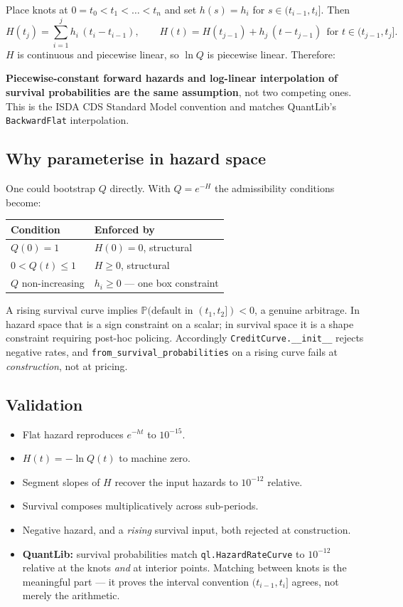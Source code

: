 \documentclass[11pt,a4paper]{article}
\newcommand{\keypoint}[1]{%
  \par\vspace{0.4em}\noindent
  \colorbox{codebg}{\parbox{\dimexpr\linewidth-2\fboxsep}{\small #1}}%
  \par\vspace{0.5em}}
\begin{document}
Place knots at $0 = t_0 < t_1 < \dots < t_n$ and set $h(s) = h_i$ for
$s \in (t_{i-1}, t_i]$. Then
\[
H(t_j) = \sum_{i=1}^{j} h_i\,(t_i - t_{i-1}),
\qquad
H(t) = H(t_{j-1}) + h_j\,(t - t_{j-1}) \ \ \text{for } t \in (t_{j-1}, t_j].
\]
$H$ is continuous and piecewise linear, so $\ln Q$ is piecewise linear. Therefore:

\keypoint{\textbf{Piecewise-constant forward hazards and log-linear interpolation of
survival probabilities are the same assumption}, not two competing ones. This is the ISDA
CDS Standard Model convention and matches QuantLib's \texttt{BackwardFlat} interpolation.}

\subsection{Why parameterise in hazard space}

One could bootstrap $Q$ directly. With $Q = e^{-H}$ the admissibility conditions become:

\begin{center}
\begin{tabular}{ll}
\toprule
\textbf{Condition} & \textbf{Enforced by} \\
\midrule
$Q(0) = 1$ & $H(0)=0$, structural \\
$0 < Q(t) \le 1$ & $H \ge 0$, structural \\
$Q$ non-increasing & $h_i \ge 0$ --- one box constraint \\
\bottomrule
\end{tabular}
\end{center}

A rising survival curve implies $\mathbb{P}(\text{default in }(t_1,t_2]) < 0$, a genuine
arbitrage. In hazard space that is a sign constraint on a scalar; in survival space it is a
shape constraint requiring post-hoc policing. Accordingly \texttt{CreditCurve.\_\_init\_\_}
rejects negative rates, and \texttt{from\_survival\_probabilities} on a rising curve fails at
\emph{construction}, not at pricing.

\subsection{Validation}

\begin{itemize}[leftmargin=1.4em,itemsep=0.15em]
\item Flat hazard reproduces $e^{-ht}$ to $10^{-15}$.
\item $H(t) = -\ln Q(t)$ to machine zero.
\item Segment slopes of $H$ recover the input hazards to $10^{-12}$ relative.
\item Survival composes multiplicatively across sub-periods.
\item Negative hazard, and a \emph{rising} survival input, both rejected at construction.
\item \textbf{QuantLib:} survival probabilities match \texttt{ql.HazardRateCurve} to
$10^{-12}$ relative at the knots \emph{and} at interior points. Matching between knots is
the meaningful part --- it proves the interval convention $(t_{i-1}, t_i]$ agrees, not merely
the arithmetic.
\end{itemize}
\end{document}
